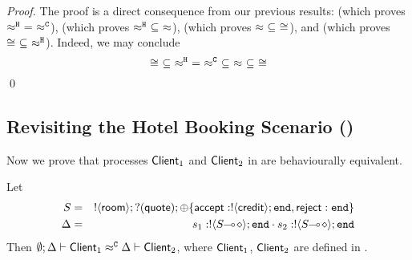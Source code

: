 \begin{proof}
	The proof is a direct consequence from our previous results:
	 (which proves $\hwb\ =\ \fwb$), 
	 (which proves $\hwb\ \subseteq\ \wbc$),
	 (which proves $\wbc\ \subseteq\ \cong$), and	
	 (which proves $\cong\ \subseteq\ \hwb$).
%
Indeed, we may conclude $$\cong\ \subseteq\ \hwb\ =\ \fwb\ \subseteq\ \wbc\ \subseteq\ \cong$$
	\qed
\end{proof}
 
\subsection{Revisiting the Hotel Booking Scenario ()}
\label{ss:examprev}

Now we prove that  processes $\mathsf{Client}_1$ and $\mathsf{Client}_2$ 
in  are behaviourally equivalent.

\begin{proposition}\label{p:examp}
	Let
	\begin{eqnarray*}
		S &=& ! \langle \mathsf{room} \rangle ; ? (\mathsf{quote}) ; \oplus \{\mathsf{accept}: ! \langle \mathsf{credit} \rangle ; \mathtt{end}, \mathsf{reject}: \mathtt{end}\}\\
		\Delta &=& s_1: ! \langle S\!\! \multimap\! \diamond \rangle ; \mathtt{end} \cdot s_2: ! \langle S\!\! \multimap\! \diamond \rangle ; \mathtt{end}
	\end{eqnarray*}
	Then
	$\emptyset; \Delta \vdash \mathsf{Client}_1 \approx^\mathtt{C} \Delta \vdash \mathsf{Client}_2$, where $\mathsf{Client}_1$, $\mathsf{Client}_2$ are defined in . 
\end{proposition}

